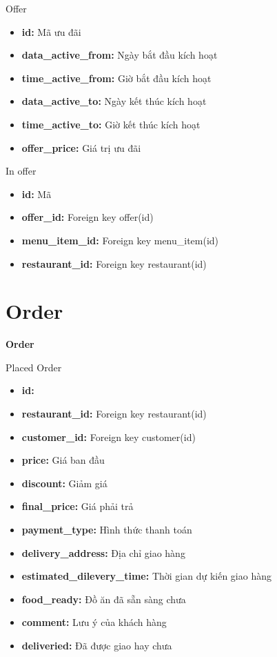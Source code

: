 \documentclass[aspectratio=43,xcolor=dvipsnames]{beamer}
\begin{document}
	\begin{frame}{Offer}
		\begin{itemize}
			\item \textbf{id: } Mã ưu đãi
			\item \textbf{data\_active\_from:} Ngày bắt đầu kích hoạt
			\item \textbf{time\_active\_from:} Giờ bắt đầu kích hoạt
			\item \textbf{data\_active\_to:} Ngày kết thúc kích hoạt
			\item \textbf{time\_active\_to:} Giờ kết thúc kích hoạt
			\item \textbf{offer\_price:} Giá trị ưu đãi
		\end{itemize}
	\end{frame}
	\begin{frame}{In offer}
		\begin{itemize}
			\item \textbf{id: } Mã
			\item \textbf{offer\_id: } Foreign key offer(id)
			\item \textbf{menu\_item\_id: } Foreign key menu\_item(id)
			\item \textbf{restaurant\_id: } Foreign key restaurant(id)
		\end{itemize}
	\end{frame}
	
	\section{Order}
	\begin{frame}
		\textcolor{structure}{\Huge{\textbf{Order}}}
	\end{frame}
	\begin{frame}{Placed Order}
		\begin{itemize}
			\item \textbf{id:}
			\item \textbf{restaurant\_id:} Foreign key restaurant(id)
			\item \textbf{customer\_id:} Foreign key customer(id)
			\item \textbf{price:} Giá ban đầu
			\item \textbf{discount:} Giảm giá 
			\item \textbf{final\_price:} Giá phải trả
			\item \textbf{payment\_type:} Hình thức thanh toán
			\item \textbf{delivery\_address:} Địa chỉ giao hàng 
			\item \textbf{estimated\_dilevery\_time:} Thời gian dự kiến giao hàng
			\item \textbf{food\_ready:} Đồ ăn đã sẵn sàng chưa
			\item \textbf{comment:} Lưu ý của khách hàng
			\item \textbf{deliveried:} Đã được giao hay chưa
		\end{itemize}
	\end{frame}
	
\end{document}
